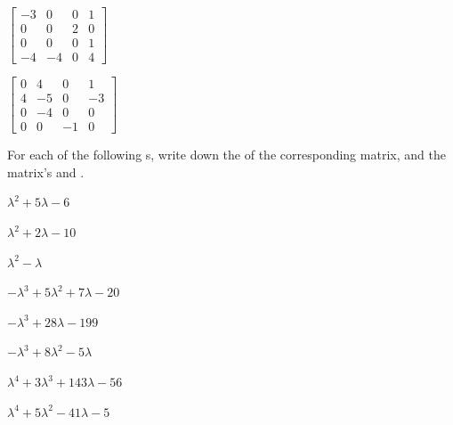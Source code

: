 \begin{exercise}
\begin{Parts}
\item \(\begin{bmatrix} -3 & 0 & 0 & 1
\\0 & 0 & 2 & 0
\\0 & 0 & 0 & 1
\\-4 & -4 & 0 & 4 \end{bmatrix}\)

\item \(\begin{bmatrix} 0 & 4 & 0 & 1
\\4 & -5 & 0 & -3
\\0 & -4 & 0 & 0
\\0 & 0 & -1 & 0 \end{bmatrix}\)

\end{Parts}
\end{exercise}








\begin{exercise}  
For each of the following s, write down the  of the corresponding matrix, and the matrix's  and .
\begin{Parts}
\item \(\lambda^2+5\lambda-6\)

\item \(\lambda^2+2\lambda-10\)

\begin{OmitV1}
\item \(\lambda^2-\lambda\)

\item \(-\lambda^3+5\lambda^2+7\lambda-20\)
\end{OmitV1}

\item \(-\lambda^3+28\lambda-199\)

\item \(-\lambda^3+8\lambda^2-5\lambda\)

\item \(\lambda^4+3\lambda^3+143\lambda-56\)

\item \(\lambda^4+5\lambda^2-41\lambda-5\)

\end{Parts}
\end{exercise}




